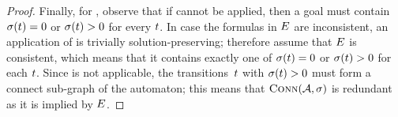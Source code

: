 \begin{proof}
  Finally, for \Subsume{}, observe that if \Split{} cannot be applied,
  then a goal must contain~$\operatorname{\sigma}(t) = 0$ or
  $\operatorname{\sigma}(t) > 0$ for every $t$. In case the
  formulas in $E$ are inconsistent, an application of
  \Subsume{} is trivially solution-preserving; therefore assume that
  $E$ is consistent, which means that it contains
  exactly one of $\operatorname{\sigma}(t) = 0$ or
  $\operatorname{\sigma}(t) > 0$ for each $t$. Since
  \Propagate{} is not applicable, the transitions~$t$ with
  $\operatorname{\sigma}(t) > 0$ must form a connect sub-graph of the
  automaton; this means that $\operatorname{\textsc{Conn}}(\mathcal{A}, \operatorname{\sigma})$ is
  redundant as it is implied by $E$.
\end{proof}